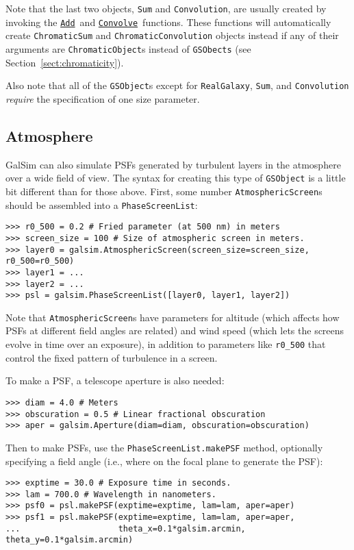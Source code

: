 \documentclass[preprint,10pt]{../../devel/modules/aastex}
\newcommand\Add{\href{http://galsim-developers.github.io/GalSim/namespacegalsim_1_1compound.html\#ad3f305087db1b740376666d9c022d94e}{\texttt{Add}}}
\newcommand\Convolve{\href{http://galsim-developers.github.io/GalSim/namespacegalsim_1_1compound.html\#a17ccb8acb75a4eb6e35e791e4177957b}{\texttt{Convolve}}}
\begin{document}
Note that the last two objects, \texttt{Sum} and \texttt{Convolution}, are usually created by
invoking the \Add\ and \Convolve\ functions.  These functions will
automatically create \texttt{ChromaticSum} and \texttt{ChromaticConvolution} objects instead if
any of their arguments are \texttt{ChromaticObject}s instead of
\texttt{GSObects} (see Section~\ref{sect:chromaticity}).

Also note that all of the \texttt{GSObject}s except for \texttt{RealGalaxy}, \texttt{Sum}, and
\texttt{Convolution} {\em require} the specification of one size
parameter.

\subsection{Atmosphere}
GalSim can also simulate PSFs generated by turbulent layers in the atmosphere over a wide field of
view.  The syntax for creating this type of \texttt{GSObject} is a little bit different than for
those above.  First, some number \texttt{AtmosphericScreen}s should be assembled into a
\texttt{PhaseScreenList}:

\begin{verbatim}
>>> r0_500 = 0.2 # Fried parameter (at 500 nm) in meters
>>> screen_size = 100 # Size of atmospheric screen in meters.
>>> layer0 = galsim.AtmosphericScreen(screen_size=screen_size, r0_500=r0_500)
>>> layer1 = ...
>>> layer2 = ...
>>> psl = galsim.PhaseScreenList([layer0, layer1, layer2])
\end{verbatim}

Note that \texttt{AtmosphericScreen}s have parameters for altitude (which affects how PSFs at
different field angles are related) and wind speed (which lets the screens evolve in time over an
exposure), in addition to parameters like \texttt{r0\_500} that control the fixed pattern of
turbulence in a screen.

To make a PSF, a telescope aperture is also needed:

\begin{verbatim}
>>> diam = 4.0 # Meters
>>> obscuration = 0.5 # Linear fractional obscuration
>>> aper = galsim.Aperture(diam=diam, obscuration=obscuration)
\end{verbatim}

Then to make PSFs, use the \texttt{PhaseScreenList.makePSF} method, optionally specifying a field
angle (i.e., where on the focal plane to generate the PSF):

\begin{verbatim}
>>> exptime = 30.0 # Exposure time in seconds.
>>> lam = 700.0 # Wavelength in nanometers.
>>> psf0 = psl.makePSF(exptime=exptime, lam=lam, aper=aper)
>>> psf1 = psl.makePSF(exptime=exptime, lam=lam, aper=aper,
...                    theta_x=0.1*galsim.arcmin, theta_y=0.1*galsim.arcmin)
\end{verbatim}
\end{document}
